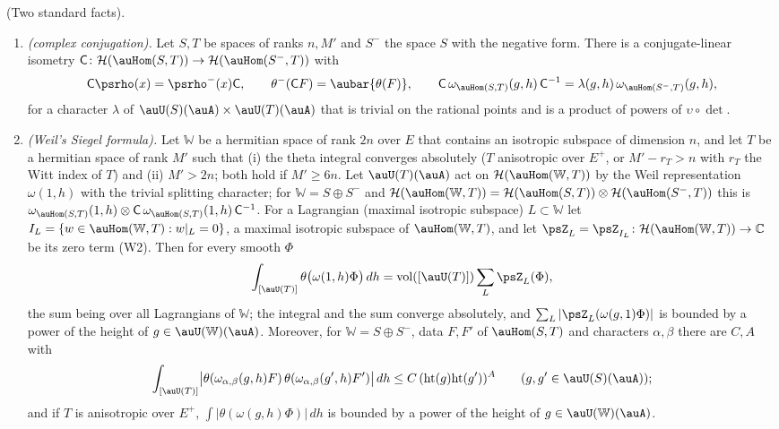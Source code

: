 \documentclass[10pt]{amsart}
\theoremstyle{definition}
\theoremstyle{remark}
\newcommand{\C}{\mathbb C}
\providecommand{\pcW}{\mathbb W}
\providecommand{\pcvol}{\operatorname{vol}}
\providecommand{\psHS}{\mathcal H}
\newenvironment{quotedthm}[2]{\par\medskip\noindent\begingroup
  \textbf{#1}#2.\ \itshape\ignorespaces}{\endgroup\par\medskip}
\begin{document}
\begin{quotedthm}{\cite[Lemma~2.13]{P53}}{ (Two standard facts)}
\begin{enumerate}
\item[(W7)] \emph{(complex conjugation).} Let $S,T$ be spaces of ranks $n,M'$ and $S^-$ the space
$S$ with the negative form. There is a conjugate-linear isometry
$\mathsf C\colon\psHS(\auHom(S,T))\to\psHS(\auHom(S^-,T))$ with
\[
\mathsf C\psrho(x)=\psrho^-(x)\mathsf C,\qquad\theta^-(\mathsf CF)=\aubar{\theta(F)},\qquad
\mathsf C\,\omega_{\auHom(S,T)}(g,h)\,\mathsf C^{-1}=\lambda(g,h)\,\omega_{\auHom(S^-,T)}(g,h),
\]
for a character $\lambda$ of $\auU(S)(\auA)\times\auU(T)(\auA)$ that is trivial on the rational
points and is a product of powers of $\upsilon\circ\det$.
\item[(SW)] \emph{(Weil's Siegel formula).} Let $\pcW$ be a hermitian space of rank $2n$ over $E$
that contains an isotropic subspace of dimension $n$, and let $T$ be a hermitian space of rank
$M'$ such that (i) the theta integral converges absolutely ($T$ anisotropic over $E^+$, or
$M'-r_T>n$ with $r_T$ the Witt index of $T$) and (ii) $M'>2n$; both hold if $M'\ge6n$. Let $\auU(T)(\auA)$ act on $\psHS(\auHom(\pcW,T))$ by the Weil representation
$\omega(1,h)$ with the trivial splitting character; for $\pcW=S\oplus S^-$ and
$\psHS(\auHom(\pcW,T))=\psHS(\auHom(S,T))\otimes\psHS(\auHom(S^-,T))$ this is
$\omega_{\auHom(S,T)}(1,h)\otimes\mathsf C\,\omega_{\auHom(S,T)}(1,h)\,\mathsf C^{-1}$. For a
Lagrangian (maximal isotropic subspace) $L\subset\pcW$ let
$I_L=\{w\in\auHom(\pcW,T):w|_L=0\}$, a maximal isotropic subspace of $\auHom(\pcW,T)$, and let
$\psZ_L=\psZ_{I_L}\colon\psHS(\auHom(\pcW,T))\to\C$ be its zero term \textup{(W2)}. Then for every
smooth $\Phi$
\[
\int_{[\auU(T)]}\theta\bigl(\omega(1,h)\Phi\bigr)\,dh=\pcvol([\auU(T)])\sum_L\psZ_L(\Phi),
\]
the sum being over all Lagrangians of $\pcW$; the integral and the sum converge absolutely, and
$\sum_L|\psZ_L(\omega(g,1)\Phi)|$ is bounded by a power of the height of $g\in\auU(\pcW)(\auA)$.
Moreover, for $\pcW=S\oplus S^-$, data $F,F'$ of $\auHom(S,T)$ and characters $\alpha,\beta$ there are
$C,A$ with
\[
\int_{[\auU(T)]}\bigl|\theta(\omega_{\alpha,\beta}(g,h)F)\,\theta(\omega_{\alpha,\beta}(g',h)F')\bigr|\,dh\le
C\,(\mathrm{ht}(g)\mathrm{ht}(g'))^A\qquad(g,g'\in\auU(S)(\auA));
\]
and if $T$ is anisotropic over $E^+$, $\int|\theta(\omega(g,h)\Phi)|\,dh$ is bounded by a power of the
height of $g\in\auU(\pcW)(\auA)$.
\end{enumerate}
\end{quotedthm}
\end{document}
